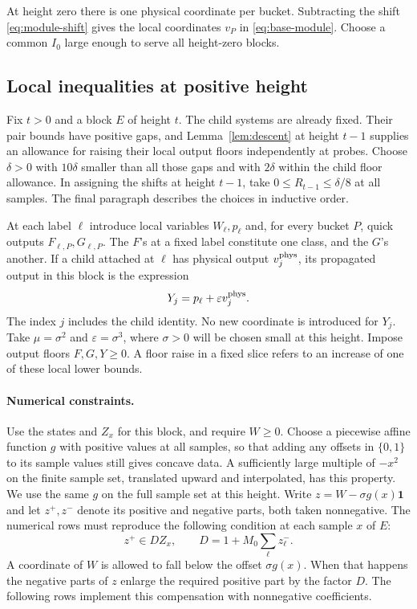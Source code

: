 At height zero there is one physical coordinate per bucket. Subtracting
the shift \eqref{eq:module-shift} gives the local coordinates $v_P$ in
\eqref{eq:base-module}. Choose a common $I_0$ large enough to serve all
height-zero blocks.

\subsection{Local inequalities at positive height}
Fix $t>0$ and a block $E$ of height $t$.
The child systems are already fixed. Their pair bounds have positive
gaps, and Lemma~\ref{lem:descent} at height \(t-1\) supplies an allowance
for raising their local output floors independently at probes. Choose
\(\delta>0\) with \(10\delta\) smaller than all those gaps and with
\(2\delta\) within the child floor allowance. In assigning the shifts
at height \(t-1\), take \(0\le R_{t-1}\le\delta/8\) at all samples.
The final paragraph describes the choices in inductive order.

At each label $\ell$ introduce local variables $W_\ell,p_\ell$ and,
for every bucket $P$, quick outputs $F_{\ell,P},G_{\ell,P}$. The
$F$'s at a fixed label constitute one class, and the $G$'s another.
If a child attached at $\ell$ has physical output $v_j^{\rm phys}$,
its propagated output in this block is the expression
\begin{equation}\label{eq:module-propagation}
 Y_j=p_\ell+\varepsilon v_j^{\rm phys}.
\end{equation}
The index $j$ includes the child identity. No new coordinate is
introduced for $Y_j$. Take $\mu=\sigma^2$ and $\varepsilon=\sigma^3$,
where $\sigma>0$ will be chosen small at this height. Impose output
floors $F,G,Y\ge0$. A floor raise in a fixed slice refers to an
increase of one of these local lower bounds.

\paragraph{Numerical constraints.}
Use the states and $Z_x$ for this block, and require $W\ge0$.
Choose a piecewise affine function $g$ with positive values at
all samples, so that adding any offsets in $\{0,1\}$ to its sample
values still gives concave data. A sufficiently large multiple of
$-x^2$ on the finite sample set, translated upward and interpolated,
has this property. We use the same \(g\) on the full sample set at this
height. Write $z=W-\sigma g(x)\mathbf1$ and let $z^+,z^-$
denote its positive and negative parts, both taken nonnegative.
The numerical rows must reproduce the following condition at each
sample \(x\) of \(E\):
\begin{equation}\label{eq:layer-state}
 z^+\in D Z_x,\qquad D=1+M_0\sum_\ell z_\ell^- .
\end{equation}
A coordinate of \(W\) is allowed to fall below the offset
\(\sigma g(x)\). When that happens the negative parts of \(z\) enlarge
the required positive part by the factor \(D\). The following rows
implement this compensation with nonnegative coefficients.


